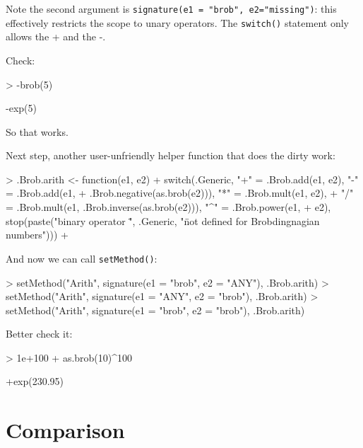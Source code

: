 \documentclass[a4paper]{article}
\begin{document}
Note the second argument is {\tt signature(e1 = "brob",
 e2="missing")}: this effectively restricts the scope to unary
 operators.  The {\tt switch()} statement only allows the + and the -.\


Check:

\begin{Schunk}
\begin{Sinput}
> -brob(5)
\end{Sinput}
\begin{Soutput}
[1] -exp(5)
\end{Soutput}
\end{Schunk}

So that works.

Next step, another user-unfriendly helper function that does the dirty work:


\begin{Schunk}
\begin{Sinput}
> .Brob.arith <- function(e1, e2) {
+     switch(.Generic, "+" = .Brob.add(e1, e2), "-" = .Brob.add(e1, 
+         .Brob.negative(as.brob(e2))), "*" = .Brob.mult(e1, e2), 
+         "/" = .Brob.mult(e1, .Brob.inverse(as.brob(e2))), "^" = .Brob.power(e1, 
+             e2), stop(paste("binary operator \"", .Generic, "\" not defined for Brobdingnagian numbers")))
+ }
\end{Sinput}
\end{Schunk}


And now we can call {\tt setMethod()}:

\begin{Schunk}
\begin{Sinput}
> setMethod("Arith", signature(e1 = "brob", e2 = "ANY"), .Brob.arith)
> setMethod("Arith", signature(e1 = "ANY", e2 = "brob"), .Brob.arith)
> setMethod("Arith", signature(e1 = "brob", e2 = "brob"), .Brob.arith)
\end{Sinput}
\end{Schunk}

Better check it:

\begin{Schunk}
\begin{Sinput}
> 1e+100 + as.brob(10)^100
\end{Sinput}
\begin{Soutput}
[1] +exp(230.95)
\end{Soutput}
\end{Schunk}



\section{Comparison}
\end{document}
